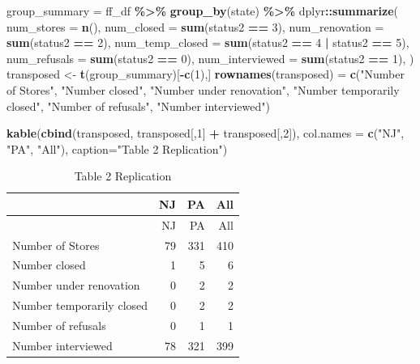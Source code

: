 \documentclass[
]{article}
\newenvironment{Shaded}{\begin{snugshade}}{\end{snugshade}}
\newcommand{\AttributeTok}[1]{\textcolor[rgb]{0.13,0.29,0.53}{#1}}
\newcommand{\DecValTok}[1]{\textcolor[rgb]{0.00,0.00,0.81}{#1}}
\newcommand{\FunctionTok}[1]{\textcolor[rgb]{0.13,0.29,0.53}{\textbf{#1}}}
\newcommand{\NormalTok}[1]{#1}
\newcommand{\OtherTok}[1]{\textcolor[rgb]{0.56,0.35,0.01}{#1}}
\newcommand{\SpecialCharTok}[1]{\textcolor[rgb]{0.81,0.36,0.00}{\textbf{#1}}}
\newcommand{\StringTok}[1]{\textcolor[rgb]{0.31,0.60,0.02}{#1}}
\begin{document}
\begin{Shaded}
\begin{Highlighting}[]
\NormalTok{group\_summary }\OtherTok{=}\NormalTok{ ff\_df }\SpecialCharTok{\%\textgreater{}\%} \FunctionTok{group\_by}\NormalTok{(state) }\SpecialCharTok{\%\textgreater{}\%}
\NormalTok{  dplyr}\SpecialCharTok{::}\FunctionTok{summarize}\NormalTok{(}
    \AttributeTok{num\_stores =} \FunctionTok{n}\NormalTok{(),}
    \AttributeTok{num\_closed =} \FunctionTok{sum}\NormalTok{(status2 }\SpecialCharTok{==} \DecValTok{3}\NormalTok{),}
    \AttributeTok{num\_renovation =} \FunctionTok{sum}\NormalTok{(status2 }\SpecialCharTok{==} \DecValTok{2}\NormalTok{),}
    \AttributeTok{num\_temp\_closed =} \FunctionTok{sum}\NormalTok{(status2 }\SpecialCharTok{==} \DecValTok{4} \SpecialCharTok{|}\NormalTok{ status2 }\SpecialCharTok{==} \DecValTok{5}\NormalTok{),}
    \AttributeTok{num\_refusals =} \FunctionTok{sum}\NormalTok{(status2 }\SpecialCharTok{==} \DecValTok{0}\NormalTok{),}
    \AttributeTok{num\_interviewed =} \FunctionTok{sum}\NormalTok{(status2 }\SpecialCharTok{==} \DecValTok{1}\NormalTok{),}
\NormalTok{  )}
\NormalTok{transposed }\OtherTok{\textless{}{-}} \FunctionTok{t}\NormalTok{(group\_summary)[}\SpecialCharTok{{-}}\FunctionTok{c}\NormalTok{(}\DecValTok{1}\NormalTok{),]}
\FunctionTok{rownames}\NormalTok{(transposed) }\OtherTok{=} \FunctionTok{c}\NormalTok{(}\StringTok{"Number of Stores"}\NormalTok{,}
                         \StringTok{"Number closed"}\NormalTok{,}
                         \StringTok{"Number under renovation"}\NormalTok{,}
                         \StringTok{"Number temporarily closed"}\NormalTok{,}
                         \StringTok{"Number of refusals"}\NormalTok{,}
                         \StringTok{"Number interviewed"}\NormalTok{)}

\FunctionTok{kable}\NormalTok{(}\FunctionTok{cbind}\NormalTok{(transposed, transposed[,}\DecValTok{1}\NormalTok{] }\SpecialCharTok{+}\NormalTok{ transposed[,}\DecValTok{2}\NormalTok{]),}
    \AttributeTok{col.names =} \FunctionTok{c}\NormalTok{(}\StringTok{"NJ"}\NormalTok{, }\StringTok{"PA"}\NormalTok{, }\StringTok{"All"}\NormalTok{),}
    \AttributeTok{caption=}\StringTok{"Table 2 Replication"}\NormalTok{)}
\end{Highlighting}
\end{Shaded}

\begin{longtable}[]{@{}lrrr@{}}
\caption{Table 2 Replication}\tabularnewline
\toprule\noalign{}
& NJ & PA & All \\
\midrule\noalign{}
\endfirsthead
\toprule\noalign{}
& NJ & PA & All \\
\midrule\noalign{}
\endhead
\bottomrule\noalign{}
\endlastfoot
Number of Stores & 79 & 331 & 410 \\
Number closed & 1 & 5 & 6 \\
Number under renovation & 0 & 2 & 2 \\
Number temporarily closed & 0 & 2 & 2 \\
Number of refusals & 0 & 1 & 1 \\
Number interviewed & 78 & 321 & 399 \\
\end{longtable}
\end{document}
